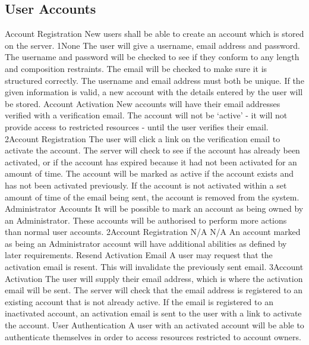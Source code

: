 	\subsection{User Accounts}
		\funcreq
			{Account Registration}
			{New users shall be able to create an account which is stored on 
			the server.}
			{1}{None}
			{The user will give a username, email address and password.}
			{The username and password will be checked to see if they conform 
			to any length and composition restraints. The email will be 
			checked to make sure it is structured correctly. The username and 
			email address must both be unique.}
			{If the given information is valid, a new account with the details 
			entered by the user will be stored.}
		\funcreq
			{Account Activation}
			{New accounts will have their email addresses verified with a 
			verification email. The account will not be `active' - it will not 
			provide access to restricted resources - until the user verifies 
			their email.}
			{2}{Account Registration}
			{The user will click a link on the verification email to activate 
			the account.}
			{The server will check to see if the account has already been 
			activated, or if the account has expired because it had not been 
			activated for an amount of time.}
			{The account will be marked as active if the account exists and 
			has not been activated previously. If the account is not activated 
			within a set amount of time of the email being sent, the account 
			is removed from the system.}
		\funcreq
			{Administrator Accounts}
			{It will be possible to mark an account as being owned by an 
			Administrator. These accounts will be authorised to perform more 
			actions than normal user accounts.}
			{2}{Account Registration}
			{N/A}
			{N/A}
			{An account marked as being an Administrator account will have 
			additional abilities as defined by later requirements.}
		\funcreq
			{Resend Activation Email}
			{A user may request that the activation email is resent. This will 
			invalidate the previously sent email.}
			{3}{Account Activation}
			{The user will supply their email address, which is where the 
			activation email will be sent.}
			{The server will check that the email address is registered to an 
			existing account that is not already active.}
			{If the email is registered to an inactivated account, an 
			activation email is sent to the user with a link to activate the 
			account.}
		\funcreq
			{User Authentication}
			{A user with an activated account will be able to authenticate 
			themselves in order to access resources restricted to account 
			owners.}
